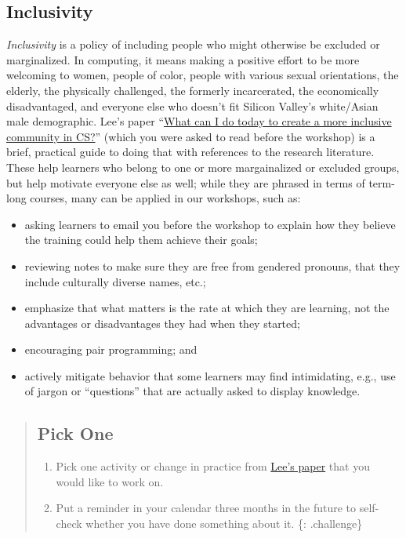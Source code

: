 \subsection{Inclusivity}\label{inclusivity}

\emph{Inclusivity} is a policy of including people who might otherwise
be excluded or marginalized. In computing, it means making a positive
effort to be more welcoming to women, people of color, people with
various sexual orientations, the elderly, the physically challenged, the
formerly incarcerated, the economically disadvantaged, and everyone else
who doesn't fit Silicon Valley's white/Asian male demographic. Lee's
paper
``\href{\{\{\%20page.root\%20\}\}/files/papers/lee-create-inclusive-community-2015.pdf}{What
can I do today to create a more inclusive community in CS?}'' (which you
were asked to read before the workshop) is a brief, practical guide to
doing that with references to the research literature. These help
learners who belong to one or more margainalized or excluded groups, but
help motivate everyone else as well; while they are phrased in terms of
term-long courses, many can be applied in our workshops, such as:

\begin{itemize}
\itemsep1pt\parskip0pt
\item
  asking learners to email you before the workshop to explain how they
  believe the training could help them achieve their goals;
\item
  reviewing notes to make sure they are free from gendered pronouns,
  that they include culturally diverse names, etc.;
\item
  emphasize that what matters is the rate at which they are learning,
  not the advantages or disadvantages they had when they started;
\item
  encouraging pair programming; and
\item
  actively mitigate behavior that some learners may find intimidating,
  e.g., use of jargon or ``questions'' that are actually asked to
  display knowledge.
\end{itemize}

\begin{quote}
\subsection{Pick One}\label{pick-one}

\begin{enumerate}
\def\labelenumi{\arabic{enumi}.}
\itemsep1pt\parskip0pt
\item
  Pick one activity or change in practice from
  \href{\{\{\%20page.root\%20\}\}/files/papers/lee-create-inclusive-community-2015.pdf}{Lee's
  paper} that you would like to work on.
\item
  Put a reminder in your calendar three months in the future to
  self-check whether you have done something about it. \{: .challenge\}
\end{enumerate}
\end{quote}
